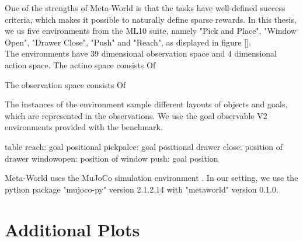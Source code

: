 One of the strengths of Meta-World is that the tasks have well-defined success criteria, which makes it possible to naturally define sparse rewards. 
In this thesis, we us five environments from the ML10 suite, namely "Pick and Place", "Window Open", "Drawer Close", "Push" and "Reach", as displayed in 
figure \ref{}. \\

The environments have 39 dimensional observation space and 4 dimensional action space. 
The actino space consists Of


The observation space consists Of


The instances of the environment sample different layouts of objects and goals, which are represented in the observations. We use the 
goal observable V2 environments provided with the benchmark.

table
reach: goal positional
pickpalce: goal positional
drawer close: position of drawer
windowopen: position of window
push: goal position

Meta-World uses the MuJoCo simulation environment \cite{todorov2012mujoco}. In our setting, we use the python package  
"mujoco-py" version 2.1.2.14 with "metaworld" version 0.1.0.   

\chapter{Additional Plots}
\label{chapter:additional_plots}

